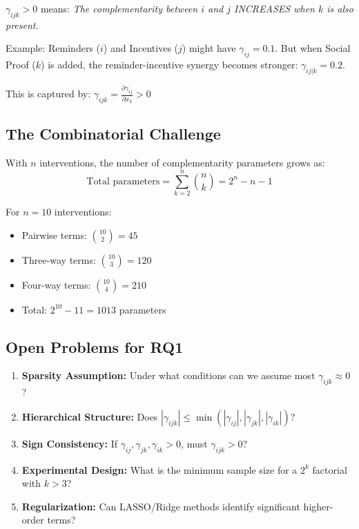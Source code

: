 \begin{tcolorbox}[colback=yellow!5!white,colframe=yellow!75!black,title=\textbf{Intuition}]
$\gamma_{ijk} > 0$ means: \textit{The complementarity between $i$ and $j$ INCREASES when $k$ is also present.}

Example: Reminders ($i$) and Incentives ($j$) might have $\gamma_{ij} = 0.1$. But when Social Proof ($k$) is added, the reminder-incentive synergy becomes stronger: $\gamma_{ij|k} = 0.2$.

This is captured by: $\gamma_{ijk} = \frac{\partial \gamma_{ij}}{\partial x_k} > 0$
\end{tcolorbox}

\subsection{The Combinatorial Challenge}

\begin{theorem}
With $n$ interventions, the number of complementarity parameters grows as:
\begin{equation}
\text{Total parameters} = \sum_{k=2}^{n} \binom{n}{k} = 2^n - n - 1
\end{equation}
\end{theorem}

\begin{example}
For $n = 10$ interventions:
\begin{itemize}[noitemsep]
    \item Pairwise terms: $\binom{10}{2} = 45$
    \item Three-way terms: $\binom{10}{3} = 120$
    \item Four-way terms: $\binom{10}{4} = 210$
    \item Total: $2^{10} - 11 = 1013$ parameters
\end{itemize}
\end{example}

\subsection{Open Problems for RQ1}

\begin{enumerate}
    \item \textbf{Sparsity Assumption:} Under what conditions can we assume most $\gamma_{ijk} \approx 0$?

    \item \textbf{Hierarchical Structure:} Does $|\gamma_{ijk}| \leq \min(|\gamma_{ij}|, |\gamma_{jk}|, |\gamma_{ik}|)$?

    \item \textbf{Sign Consistency:} If $\gamma_{ij}, \gamma_{jk}, \gamma_{ik} > 0$, must $\gamma_{ijk} > 0$?

    \item \textbf{Experimental Design:} What is the minimum sample size for a $2^k$ factorial with $k > 3$?

    \item \textbf{Regularization:} Can LASSO/Ridge methods identify significant higher-order terms?
\end{enumerate}


